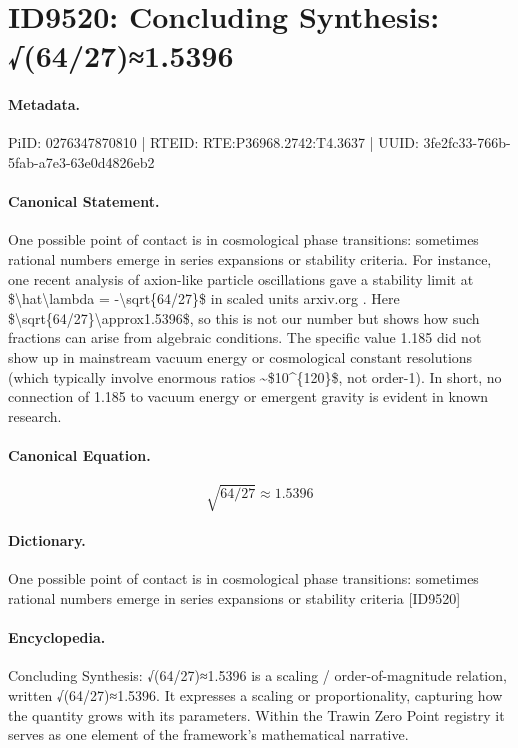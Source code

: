 \section*{ID9520: Concluding Synthesis: √(64/27)≈1.5396}
\paragraph{Metadata.}
PiID: 0276347870810 | RTEID: RTE:P36968.2742:T4.3637 | UUID: 3fe2fc33-766b-5fab-a7e3-63e0d4826eb2

\paragraph{Canonical Statement.}
One possible point of contact is in cosmological phase transitions: sometimes rational numbers emerge in series expansions or stability criteria. For instance, one recent analysis of axion-like particle oscillations gave a stability limit at \$\textbackslash{}hat\textbackslash{}lambda = -\textbackslash{}sqrt\{64/27\}\$ in scaled units arxiv.org . Here \$\textbackslash{}sqrt\{64/27\}\textbackslash{}approx1.5396\$, so this is not our number but shows how such fractions can arise from algebraic conditions. The specific value 1.185 did not show up in mainstream vacuum energy or cosmological constant resolutions (which typically involve enormous ratios \textasciitilde{}\$10\textasciicircum{}\{120\}\$, not order-1). In short, no connection of 1.185 to vacuum energy or emergent gravity is evident in known research.

\paragraph{Canonical Equation.}
\[
\sqrt{64/27}\approx1.5396
\]

\paragraph{Dictionary.}
One possible point of contact is in cosmological phase transitions: sometimes rational numbers emerge in series expansions or stability criteria [ID9520]

\paragraph{Encyclopedia.}
Concluding Synthesis: √(64/27)≈1.5396 is a scaling / order-of-magnitude relation, written √(64/27)≈1.5396. It expresses a scaling or proportionality, capturing how the quantity grows with its parameters. Within the Trawin Zero Point registry it serves as one element of the framework's mathematical narrative.
